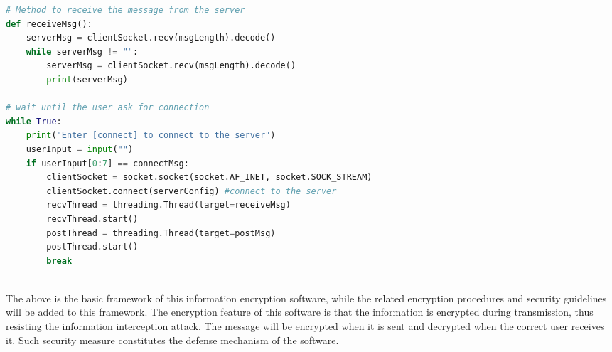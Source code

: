\documentclass[12pt, border = 4pt, multi]{article} %
\begin{document}
\begin{multicols}{2}
\begin{lstlisting}[language = python]
# Method to receive the message from the server 
def receiveMsg():
    serverMsg = clientSocket.recv(msgLength).decode()
    while serverMsg != "":
        serverMsg = clientSocket.recv(msgLength).decode()
        print(serverMsg)

# wait until the user ask for connection
while True: 
    print("Enter [connect] to connect to the server")
    userInput = input("")
    if userInput[0:7] == connectMsg:
        clientSocket = socket.socket(socket.AF_INET, socket.SOCK_STREAM)
        clientSocket.connect(serverConfig) #connect to the server
        recvThread = threading.Thread(target=receiveMsg)
        recvThread.start()
        postThread = threading.Thread(target=postMsg)
        postThread.start()
        break
\end{lstlisting}
\\
The above is the basic framework of this information encryption software, while the related encryption procedures and security guidelines will be added to this framework. The encryption feature of this software is that the information is encrypted during transmission, thus resisting the information interception attack. The message will be encrypted when it is sent and decrypted when the correct user receives it. Such security measure constitutes the defense mechanism of the software.
\end{multicols}
\newpage
\end{document}
